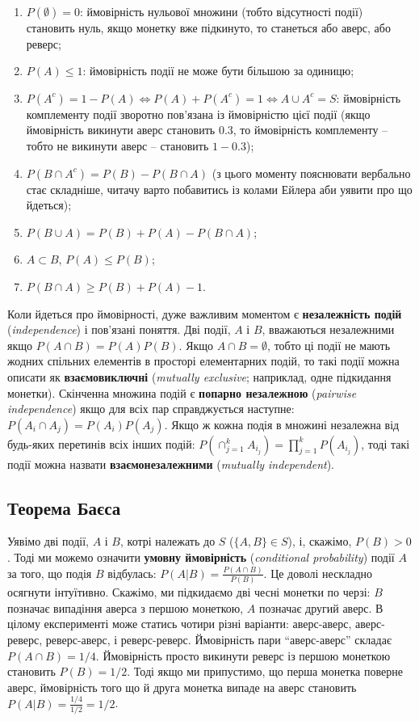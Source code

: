 \documentclass[
  11pt,
]{book}
\providecommand{\tightlist}{%
  \setlength{\itemsep}{0pt}\setlength{\parskip}{0pt}}
\begin{document}
\begin{enumerate}
\def\labelenumi{\arabic{enumi}.}
\tightlist
\item
  \(P(\emptyset) = 0\): ймовірність нульової множини (тобто відсутності події) становить нуль, якщо монетку вже підкинуто, то станеться або аверс, або реверс;
\item
  \(P(A) \leq 1\): ймовірність події не може бути більшою за одиницю;
\item
  \(P(A^c) = 1 - P(A) \Leftrightarrow P(A) + P(A^c) = 1 \Leftrightarrow A \cup A^c = S\): ймовірність комплементу події зворотно пов'язана із ймовірністю цієї події (якщо ймовірність викинути аверс становить \(0.3\), то ймовірність комплементу -- тобто не викинути аверс -- становить \(1-0.3\));
\item
  \(P(B \cap A^c) = P(B) - P(B\cap A)\) (з цього моменту пояснювати вербально стає складніше, читачу варто побавитись із колами Ейлера аби уявити про що йдеться);
\item
  \(P(B \cup A) = P(B) + P(A) - P(B\cap A)\);
\item
  \(A \subset B\), \(P(A) \leq P(B)\);
\item
  \(P(B \cap A) \geq P(B) + P(A) - 1\).
\end{enumerate}

Коли йдеться про ймовірності, дуже важливим моментом є \textbf{незалежність подій} (\emph{independence}) і пов'язані поняття. Дві події, \(A\) і \(B\), вважаються незалежними якщо \(P(A \cap B) = P(A) P(B)\). Якщо \(A \cap B = \emptyset\), тобто ці події не мають жодних спільних елементів в просторі елементарних подій, то такі події можна описати як \textbf{взаємовиключні} (\emph{mutually exclusive}; наприклад, одне підкидання монетки). Скінченна множина подій є \textbf{попарно незалежною} (\emph{pairwise independence}) якщо для всіх пар справджується наступне: \(P(A_i \cap A_j) = P(A_i)P(A_j)\). Якщо ж кожна подія в множині незалежна від будь-яких перетинів всіх інших подій: \(P(\cap_{j=1}^k A_{i_j}) = \prod_{j=1}^k P(A_{i_j})\), тоді такі події можна назвати \textbf{взаємонезалежними} (\emph{mutually independent}).

\subsection{Теорема Баєса}\label{bayes}

Уявімо дві події, \(A\) і \(B\), котрі належать до \(S\) (\(\{A, B\} \in S\)), і, скажімо, \(P(B) > 0\). Тоді ми можемо означити \textbf{умовну ймовірність} (\emph{conditional probability}) події \(A\) за того, що подія \(B\) відбулась: \(P(A|B) = \frac{P(A \cap B)}{P(B)}\). Це доволі нескладно осягнути інтуїтивно. Скажімо, ми підкидаємо дві чесні монетки по черзі: \(B\) позначає випадіння аверса з першою монеткою, \(A\) позначає другий аверс. В цілому експерименті може статись чотири різні варіанти: аверс-аверс, аверс-реверс, реверс-аверс, і реверс-реверс. Ймовірність пари ``аверс-аверс'' складає \(P(A \cap B) = 1/4\). Ймовірність просто викинути реверс із першою монеткою становить \(P(B) = 1/2\). Тоді якщо ми припустимо, що перша монетка поверне аверс, ймовірність того що й друга монетка випаде на аверс становить \(P(A | B) = \frac{1/4}{1/2} = 1/2\).
\end{document}
